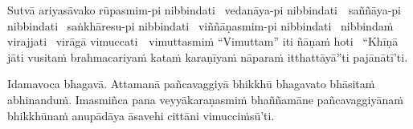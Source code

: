 \vspace{-0.99em} %

\begin{pali-hang}
  Sutvā ariyasāvako rūpasmim-pi nibbindati \breathmark\ vedanāya-pi \mbox{nibbindati}~\breathmark\ saññāya-pi nibbindati \breathmark\ saṅkhāresu-pi nibbindati \breathmark\ viññāṇasmim-pi nibbindati \breathmark\ nibbindaṁ virajjati \breathmark\ virāgā \mbox{vimuccati}~\breathmark\ vimuttasmiṁ ``Vimuttam'' iti ñāṇaṁ hoti \breathmark\ ``Khīṇā jāti vusitaṁ brahmacariyaṁ kataṁ karaṇīyaṁ nāparaṁ itthattāyā''ti pajānātī'ti.
\end{pali-hang}

\clearpage

\begin{pali-hang}
  Idamavoca bhagavā. Attamanā pañcavaggiyā bhikkhū bhagavato bhāsitaṁ abhinanduṁ. Imasmiñca pana veyyākaraṇasmiṁ bhaññamāne pañcavaggiyānaṁ bhikkhūnaṁ anupādāya āsavehi cittāni vimucciṁsū'ti.
\end{pali-hang}

\suttaRef{[SN 22.59]}

